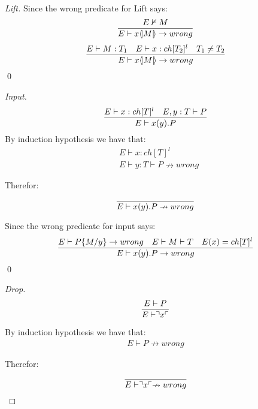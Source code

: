 \begin{theorem}
\begin{proof}[Lift]
        Since the wrong predicate for Lift says:
        \begin{align*}
            \frac{E \nvdash M}{E \vdash x \langle \! | M | \! \rangle \rightarrow wrong}
        \end{align*}
        \begin{align*}
            \frac{E \vdash M:T_1 \quad E \vdash x:ch[T_2]^l \quad T_1 \neq T_2}{E \vdash x \langle \! | M | \! \rangle \rightarrow wrong}
        \end{align*}
        \qed
    \end{proof}

    \begin{proof}[Input]
        \begin{align*}
            \frac{E \vdash x:ch[T]^l \quad E,y:T \vdash P}{E \vdash x(y).P}
        \end{align*}
        By induction hypothesis we have that:
        \begin{align*}
            &E \vdash x:ch[T]^l\\
            &E \vdash y:T \vdash P \nrightarrow wrong
        \end{align*}

        Therefor:
        \begin{align*}
            \frac{}{E \vdash x(y).P \nrightarrow wrong}
        \end{align*}

        Since the wrong predicate for input says:
        \begin{align*}
            \frac{E \vdash P\{M/y\}\rightarrow wrong \quad E\vdash M\vdash T \quad E(x)=ch[T]^l}{E \vdash x(y).P \rightarrow wrong}
        \end{align*}
        \qed
    \end{proof}

    \begin{proof}[Drop]
        \begin{align*}
            \frac{E \vdash P}{E \vdash \urcorner x \ulcorner}
        \end{align*}

        By induction hypothesis we have that:
        \begin{align*}
            E \vdash P \nrightarrow wrong
        \end{align*}

        Therefor:
        \begin{align*}
            \frac{}{E \vdash \urcorner x \ulcorner \nrightarrow wrong}
        \end{align*}


\end{proof}
\end{theorem}
